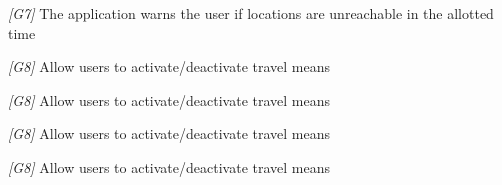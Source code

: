                   
\item \textit{[G7]} The application warns the user if locations are unreachable in the allotted time 

\item \textit{[G8]} Allow users to activate/deactivate travel means

\item \textit{[G8]} Allow users to activate/deactivate travel means

\item \textit{[G8]} Allow users to activate/deactivate travel means

\item \textit{[G8]} Allow users to activate/deactivate travel means


    
